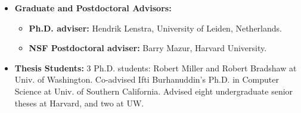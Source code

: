 \documentclass[11pt]{article}
\begin{document}
\newcommand{\hl}[1]{#1}%
\begin{itemize}\setlength{\itemsep}{0ex}
\item \textbf{Graduate and Postdoctoral Advisors:}
\begin{itemize}
\item {\bf Ph.D. adviser:} Hendrik Lenstra, University of Leiden,
Netherlands.%
\item {\bf NSF Postdoctoral adviser:} Barry Mazur, Harvard
University.
\end{itemize}
\item \textbf{Thesis Students:}  3 Ph.D. students:  
Robert Miller and Robert Bradshaw at Univ. of Washington.
Co-advised Ifti Burhanuddin's Ph.D. in Computer Science at Univ. of
Southern California. Advised eight undergraduate senior theses at
Harvard, and two at UW. 
\end{itemize}
\end{document}
